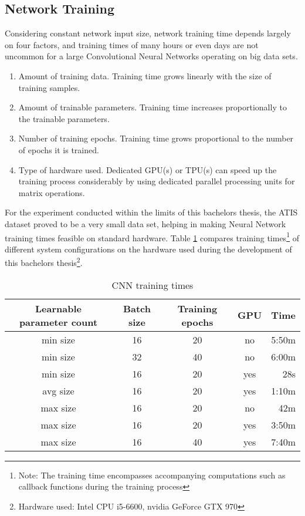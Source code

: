 \documentclass[11pt,a4paper,twoside,openright]{scrbook}
\begin{document}
\subsection{Network Training}
Considering constant network input size, network training time depends largely on four factors, and training times of many hours or even days are not uncommon for a large Convolutional Neural Networks operating on big data sets.
\begin{enumerate}
  \item Amount of training data. Training time grows linearly with the size of training samples.
  \item Amount of trainable parameters. Training time increases proportionally to the trainable parameters.
  \item Number of training epochs. Training time grows proportional to the number of epochs it is trained.
  \item Type of hardware used. Dedicated GPU(s) or TPU(s) can speed up the training process considerably by using dedicated parallel processing units for matrix operations.
\end{enumerate}

For the experiment conducted within the limits of this bachelors thesis, the ATIS dataset proved to be a very small data set, helping in making Neural Network training times feasible on standard hardware.
Table \ref{table:cnntime} compares training times\footnote{Note: The training time encompasses accompanying computations such as callback functions during the training process} of different system configurations on the hardware used during the development of this bachelors thesis\footnote{Hardware used: Intel CPU i5-6600, nvidia GeForce GTX 970}.

\begin{table}[h]
  \begin{center}
    \begin{tabular}{| c | c | c | c || r |}
      \hline Learnable parameter count & Batch size & Training epochs & GPU & Time \\ \hline
      min size & 16 & 20 & no & 5:50m \\
      min size & 32 & 40 & no & 6:00m \\
      min size & 16 & 20 & yes & 28s \\
      avg size & 16 & 20 & yes & 1:10m \\
      max size & 16 & 20 & no & 42m \\
      max size & 16 & 20 & yes & 3:50m \\
      max size & 16 & 40 & yes & 7:40m \\ \hline

    \end{tabular}
  \end{center}
  \caption{CNN training times}
  \label{table:cnntime}
\end{table}
\end{document}
